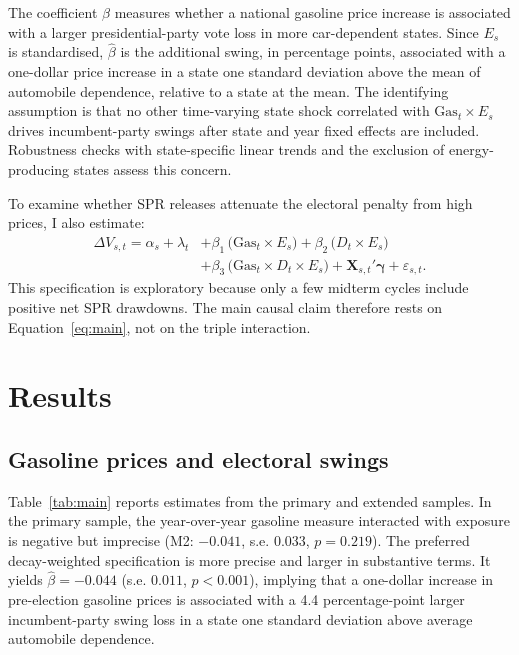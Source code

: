 \documentclass[12pt]{article}
\begin{document}
The coefficient $\beta$ measures whether a national gasoline price increase is associated with a larger presidential-party vote loss in more car-dependent states. Since $E_s$ is standardised, $\hat\beta$ is the additional swing, in percentage points, associated with a one-dollar price increase in a state one standard deviation above the mean of automobile dependence, relative to a state at the mean. The identifying assumption is that no other time-varying state shock correlated with $\mathrm{Gas}_t\times E_s$ drives incumbent-party swings after state and year fixed effects are included. Robustness checks with state-specific linear trends and the exclusion of energy-producing states assess this concern.

To examine whether SPR releases attenuate the electoral penalty from high prices, I also estimate:
\begin{align}
  \Delta V_{s,t} = \alpha_s + \lambda_t
  &+ \beta_1\,\bigl(\mathrm{Gas}_t \times E_s\bigr)
  + \beta_2\,\bigl(D_t \times E_s\bigr) \nonumber \\
  &+ \beta_3\,\bigl(\mathrm{Gas}_t \times D_t \times E_s\bigr)
  + \mathbf{X}_{s,t}'\boldsymbol{\gamma}
  + \varepsilon_{s,t}.
  \label{eq:triple}
\end{align}
This specification is exploratory because only a few midterm cycles include positive net SPR drawdowns. The main causal claim therefore rests on Equation~\ref{eq:main}, not on the triple interaction.

\section{Results}
\label{sec:results}

\subsection{Gasoline prices and electoral swings}

Table~\ref{tab:main} reports estimates from the primary and extended samples. In the primary sample, the year-over-year gasoline measure interacted with exposure is negative but imprecise (M2: $-0.041$, s.e. $0.033$, $p=0.219$). The preferred decay-weighted specification is more precise and larger in substantive terms. It yields $\hat\beta=-0.044$ (s.e. $0.011$, $p<0.001$), implying that a one-dollar increase in pre-election gasoline prices is associated with a 4.4 percentage-point larger incumbent-party swing loss in a state one standard deviation above average automobile dependence.
\end{document}
